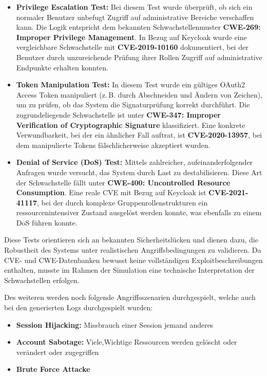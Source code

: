 \documentclass[a4paper,12pt]{article}
\begin{document}
	\begin{itemize}
		\item \textbf{Privilege Escalation Test:}
		Bei diesem Test wurde überprüft, ob sich ein normaler Benutzer unbefugt Zugriff auf administrative Bereiche verschaffen kann. Die Logik entspricht dem bekannten Schwachstellenmuster \textbf{CWE-269: Improper Privilege Management}. In Bezug auf Keycloak wurde eine vergleichbare Schwachstelle mit \textbf{CVE-2019-10160} dokumentiert, bei der Benutzer durch unzureichende Prüfung ihrer Rollen Zugriff auf administrative Endpunkte erhalten konnten.
		\item \textbf{Token Manipulation Test:}  
		In diesem Test wurde ein gültiges OAuth2 Access Token manipuliert (z.\,B. durch Abschneiden und Ändern von Zeichen), um zu prüfen, ob das System die Signaturprüfung korrekt durchführt. Die zugrundeliegende Schwachstelle ist unter \textbf{CWE-347: Improper Verification of Cryptographic Signature} klassifiziert. Eine konkrete Verwundbarkeit, bei der ein ähnlicher Fall auftrat, ist \textbf{CVE-2020-13957}, bei dem manipulierte Tokens fälschlicherweise akzeptiert wurden.
		\item \textbf{Denial of Service (DoS) Test:}  
		Mittels zahlreicher, aufeinanderfolgender Anfragen wurde versucht, das System durch Last zu destabilisieren. Diese Art der Schwachstelle fällt unter \textbf{CWE-400: Uncontrolled Resource Consumption}. Eine reale CVE mit Bezug auf Keycloak ist \textbf{CVE-2021-41117}, bei der durch komplexe Gruppenrollenstrukturen ein ressourcenintensiver Zustand ausgelöst werden konnte, was ebenfalls zu einem DoS führen konnte.
	\end{itemize}
	
	Diese Tests orientieren sich an bekannten Sicherheitslücken und dienen dazu, die Robustheit des Systems unter realistischen Angriffsbedingungen zu validieren. Da CVE- und CWE-Datenbanken bewusst keine vollständigen Exploitbeschreibungen enthalten, musste im Rahmen der Simulation eine technische Interpretation der Schwachstellen erfolgen.
	
	Des weiteren werden noch folgende Angriffsszenarien durchgespielt, welche auch bei den generierten Logs durchgespielt wurden:
	
	\begin{itemize}
		\item \textbf{Session Hijacking:}  Missbrauch einer Session jemand anderes
		\item \textbf{Account Sabotage:}  Viele,Wichtige Ressourcen werden gelöscht oder verändert oder zugegriffen
		\item \textbf{Brute Force Attacke} 
	\end{itemize}
	
\end{document}
